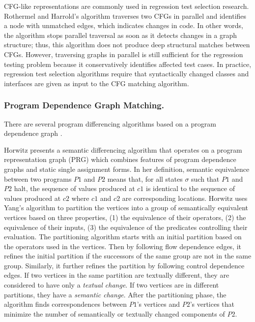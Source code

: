 \documentclass[runningheads,a4paper]{llncs}
\begin{document}
CFG-like representations are commonly used in regression test selection research. Rothermel and Harrold's algorithm \cite{Rothermel1997} traverses two CFGs in parallel and identifies a node with unmatched edges, which indicates changes in code. In other words, the algorithm stops parallel traversal as soon as it detects changes in a graph structure; thus, this algorithm does not produce deep structural matches between CFGs. However, traversing graphs in parallel is still sufficient for the regression testing problem because it conservatively identifies affected test cases. In practice, regression test selection algorithms \cite{Harrold2001, Orso2004} require that syntactically changed classes and interfaces are given as input to the CFG matching algorithm. 

\subsubsection{Program Dependence Graph Matching.}
There are several program differencing algorithms based on a program dependence graph \cite{Horwitz1990, Binkley1995, Jackson1994}. 

Horwitz \cite{Horwitz1990} presents a semantic differencing algorithm that operates on a program representation graph (PRG) which combines features of program dependence graphs and static single assignment forms. In her definition, semantic equivalence between two programs $P1$ and $P2$ means that, for all states $\sigma$ such that $P1$ and $P2$ halt, the sequence of values produced at $c1$ is identical to the sequence of values produced at $c2$ where $c1$ and $c2$ are corresponding locations. 
Horwitz uses Yang's algorithm \cite{Yang1989} to partition the vertices into a group of semantically equivalent vertices based on three properties, (1) the equivalence of their operators, (2) the equivalence of their inputs, (3) the equivalence of the predicates controlling their evaluation. The partitioning algorithm starts with an initial partition based on the operators used in the vertices. Then by following flow dependence edges, it refines the initial partition if the successors of the same group are not in the same group. Similarly, it further refines the partition by following control dependence edges. If two vertices in the same partition are textually different, they are considered to have only a {\it textual change}. If two vertices are in different partitions, they have a {\it semantic change}. After the partitioning phase, the algorithm finds correspondences between $P1$'s vertices and $P2$'s vertices that minimize the number of semantically or textually changed components of $P2$. 
\end{document}
